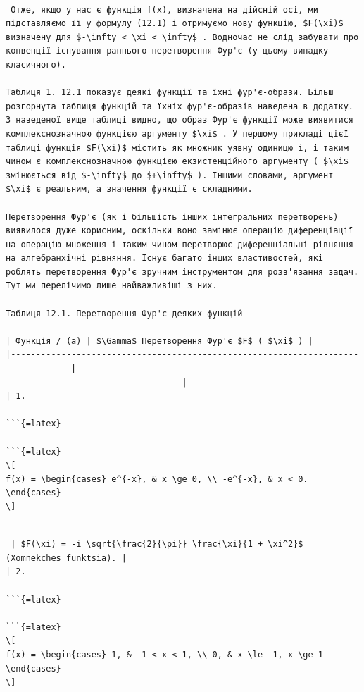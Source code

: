 \documentclass[
  ukrainian,
]{article}
\begin{document}
\begin{verbatim}

 Отже, якщо у нас є функція f(x), визначена на дійсній осі, ми підставляємо її у формулу (12.1) і отримуємо нову функцію, $F(\xi)$ визначену для $-\infty < \xi < \infty$ . Водночас не слід забувати про конвенції існування раннього перетворення Фур'є (у цьому випадку класичного).

Таблиця 1. 12.1 показує деякі функції та їхні фур'є-образи. Більш розгорнута таблиця функцій та їхніх фур'є-образів наведена в додатку. З наведеної вище таблиці видно, що образ Фур'є функції може виявитися комплекснозначною функцією аргументу $\xi$ . У першому прикладі цієї таблиці функція $F(\xi)$ містить як множник уявну одиницю i, і таким чином є комплекснозначною функцією екзистенційного аргументу ( $\xi$ змінюється від $-\infty$ до $+\infty$ ). Іншими словами, аргумент $\xi$ є реальним, а значення функції є складними.

Перетворення Фур'є (як і більшість інших інтегральних перетворень) виявилося дуже корисним, оскільки воно замінює операцію диференціації на операцію множення і таким чином перетворює диференціальні рівняння на алгебранхічні рівняння. Існує багато інших властивостей, які роблять перетворення Фур'є зручним інструментом для розв'язання задач. Тут ми перелічимо лише найважливіші з них.

Таблиця 12.1. Перетворення Фур'є деяких функцій

| Функція / (a) | $\Gamma$ Перетворення Фур'є $F$ ( $\xi$ ) |
|----------------------------------------------------------------------------------|-------------------------------------------------------------------------------------------|
| 1. 

```{=latex}

```{=latex}
\[
f(x) = \begin{cases} e^{-x}, & x \ge 0, \\ -e^{-x}, & x < 0. \end{cases}
\]
\end{verbatim}

\begin{verbatim}

 | $F(\xi) = -i \sqrt{\frac{2}{\pi}} \frac{\xi}{1 + \xi^2}$ (Xomnekches funktsia). |
| 2. 

```{=latex}

```{=latex}
\[
f(x) = \begin{cases} 1, & -1 < x < 1, \\ 0, & x \le -1, x \ge 1 \end{cases}
\]
\end{verbatim}
\end{document}
